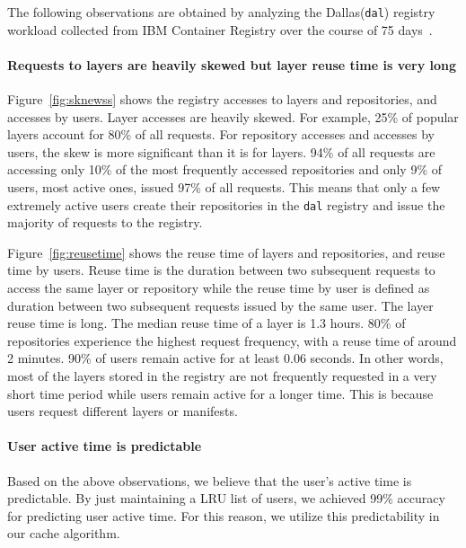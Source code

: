

The following observations are obtained by analyzing the Dallas(\texttt{dal}) registry workload collected from IBM Container Registry over the course of 75 days~\cite{dockerworkload}. 
\paragraph{Requests to layers are heavily skewed but layer reuse time is very long}

Figure~\ref{fig:sknewss} shows the registry accesses to layers and repositories, and accesses by users. 
Layer accesses are heavily skewed. For example, 25\% of popular layers account for 80\% of all requests. 
For repository accesses and accesses by users, the skew is more significant than it is for layers. %
94\% of all requests are accessing only 10\% of the most frequently accessed repositories and only 9\% of users, most active ones, issued 97\% of all requests. 
This means that only a few extremely active users create their repositories in the \texttt{dal} registry and issue the majority of requests to the registry.

Figure~\ref{fig:reusetime} shows the reuse time of layers and repositories, and reuse time by users.
Reuse time is the duration between two subsequent requests to access the same layer or repository while 
the reuse time by user is defined as duration between two subsequent requests issued by the same user. 
The layer reuse time is long.
The median reuse time of a layer is 1.3 hours. 80\% of repositories experience the highest request frequency, with a reuse time of around 2 minutes. 
90\% of users remain active for at least 0.06 seconds.
In other words, most of the layers stored in the
registry are not frequently requested in a very short
time period while users remain active for a longer time.
This is because users request different layers or manifests.

\paragraph{User active time is predictable} 
Based on the above observations, we believe that the user's active time is predictable. 
By just maintaining a LRU list of users, we achieved 99\% accuracy for predicting user active time.
For this reason, we utilize this predictability in our cache algorithm.

